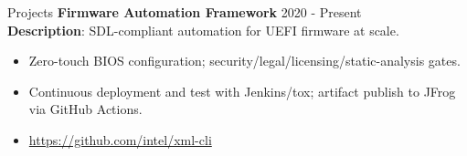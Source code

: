 \documentclass{resume} %
\begin{document}
\begin{rSection}{Projects}
{\bf Firmware Automation Framework}  \hfill {2020 - Present} \\
\textbf{Description}: SDL-compliant automation for UEFI firmware at scale.

\begin{itemize}
    \item Zero-touch BIOS configuration; security/legal/licensing/static-analysis gates.
    \item Continuous deployment and test with Jenkins/tox; artifact publish to JFrog via GitHub Actions.
    \item \href{https://github.com/intel/xml-cli}{https://github.com/intel/xml-cli}
\end{itemize}





\end{rSection}

\end{document}
